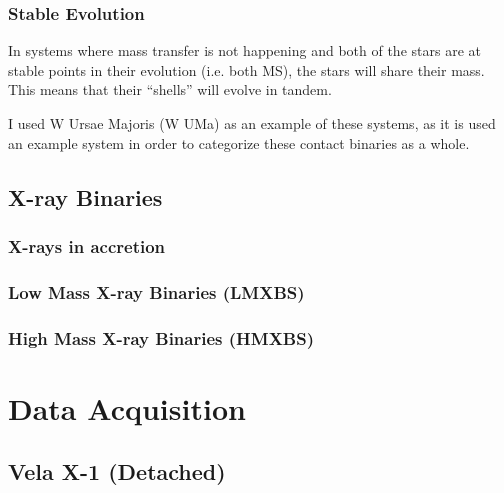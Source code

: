 \documentclass[12pt, letterpaper]{article}
\begin{document}
        \subsubsection{Stable Evolution}\label{StableEvoluton}
            In systems where mass transfer is not happening and both of the stars are at stable points in their evolution (i.e. both MS), the stars will share their mass. This means that their ``shells'' will evolve in tandem.

        I used W Ursae Majoris (W UMa) as an example of these systems, as it is used an example system in order to categorize these contact binaries as a whole.
    \subsection{X-ray Binaries} 
        \subsubsection{X-rays in accretion} \label{XrayAccretion}
        \subsubsection{Low Mass X-ray Binaries (LMXBS)} \label{lmxbs}
        \subsubsection{High Mass X-ray Binaries (HMXBS)} \label{Hmxbs}

        
        
        
\section{\centering Data Acquisition}
    \subsection{\centering Vela X-1 (Detached)}
    
\end{document}
